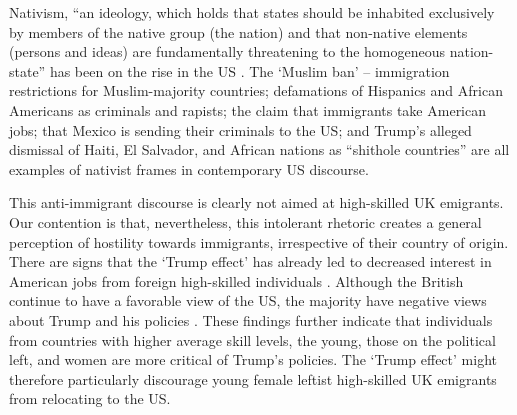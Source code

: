 \documentclass[12pt]{article}
\begin{document}

\par Nativism, ``an ideology, which holds that states should be inhabited exclusively by members of the native group (the nation) and that non-native elements (persons and ideas) are fundamentally threatening to the homogeneous nation-state'' \citep[p.2]{Mudde2012} 
has been on the rise in the US \citep{Wadhwa2009}. %
The `Muslim ban' -- immigration restrictions for Muslim-majority countries; defamations of Hispanics and African Americans as criminals and rapists; the claim that immigrants take American jobs; that Mexico is sending their criminals to the US; and Trump's alleged dismissal of Haiti, El Salvador, and African nations as ``shithole countries'' are all examples of nativist frames in contemporary US discourse. %

\par This anti-immigrant discourse is clearly not aimed at high-skilled UK emigrants.  Our contention is that, nevertheless, this intolerant rhetoric creates a general perception of hostility towards immigrants, irrespective of their country of origin. %
There are signs that the `Trump effect' has already led to decreased interest in American jobs from foreign high-skilled individuals \citep{Murnane2017}. Although the British continue to have a favorable view of the US, 
the majority have negative views about Trump and his policies \citep{DeVries2018,Wike2017}. %
These findings further indicate that individuals from countries with higher average skill levels, the young, those on the political left, and women are more critical of Trump's policies. The `Trump effect' might therefore particularly discourage young female leftist high-skilled UK emigrants from relocating to the US.
\end{document}
